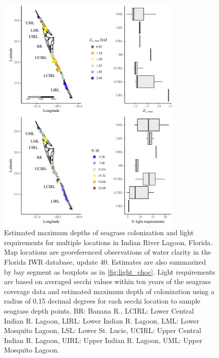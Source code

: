 \documentclass[letterpaper,12pt,oneside]{article}\usepackage[]{graphicx}\usepackage[]{color}
\begin{document}
\begin{figure}
\centering
\includegraphics[width = 0.8\textwidth]{figs/FigS4.pdf}
\caption{Estimated maximum depths of seagrass colonization and light requirements for multiple locations in Indian River Lagoon, Florida.  Map locations are georeferenced observations of water clarity in the Florida \acl{IWR} database, update 40.  Estimates are also summarized by bay segment as boxplots as in \cref{fig:light_choc}. Light requirements are based on averaged secchi values within ten years of the seagrass coverage data and estimated maximum depth of colonization using a radius of 0.15 decimal degrees for each secchi location to sample seagrass depth points. BR: Banana R., LCIRL: Lower Central Indian R. Lagoon, LIRL: Lower Indian R. Lagoon, LML: Lower Mosquito Lagoon, LSL: Lower St. Lucie, UCIRL: Upper Central Indian R. Lagoon, UIRL: Upper Indian R. Lagoon, UML: Upper Mosquito Lagoon.}
\label{fig:light_irl_zcmax}
\end{figure}
\end{document}
